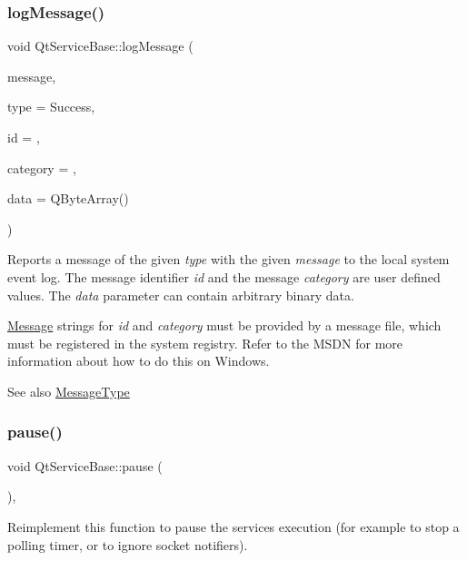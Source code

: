 \subsubsection{\texorpdfstring{log\+Message()}{logMessage()}}
{\footnotesize\ttfamily void Qt\+Service\+Base\+::log\+Message (\begin{DoxyParamCaption}\item[{const Q\+String \&}]{message,  }\item[{\hyperlink{class_qt_service_base_acffd9389fe7178bf1f35d8bf3dae1095}{Qt\+Service\+Base\+::\+Message\+Type}}]{type = {\ttfamily Success},  }\item[{int}]{id = {},  }\item[{uint}]{category = {},  }\item[{const Q\+Byte\+Array \&}]{data = {\ttfamily QByteArray()} }\end{DoxyParamCaption})}

Reports a message of the given {\itshape type} with the given {\itshape message} to the local system event log. The message identifier {\itshape id} and the message {\itshape category} are user defined values. The {\itshape data} parameter can contain arbitrary binary data.

\hyperlink{class_message}{Message} strings for {\itshape id} and {\itshape category} must be provided by a message file, which must be registered in the system registry. Refer to the M\+S\+DN for more information about how to do this on Windows.

\begin{DoxySeeAlso}{See also}
\hyperlink{class_qt_service_base_acffd9389fe7178bf1f35d8bf3dae1095}{Message\+Type} 
\end{DoxySeeAlso}
\mbox{\label{class_qt_service_base_a43215a7c5c047d30bcf4f697e6691f89}} 
\subsubsection{\texorpdfstring{pause()}{pause()}}
{\footnotesize\ttfamily void Qt\+Service\+Base\+::pause (\begin{DoxyParamCaption}{ }\end{DoxyParamCaption})\hspace{0.3cm}{\ttfamily [protected]}, {\ttfamily [virtual]}}

Reimplement this function to pause the service\textquotesingle{}s execution (for example to stop a polling timer, or to ignore socket notifiers).

